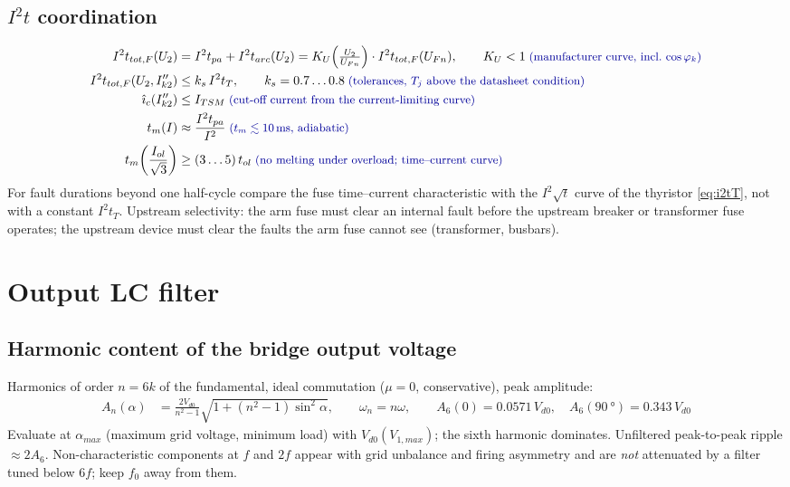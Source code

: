 \documentclass[10pt,a4paper]{scrartcl}
\newcommand{\Vdo}{V_{d0}}
\newcommand{\ITSM}{I_{TSM}}
\newcommand{\iit}{I^{2}t}
\newcommand{\Tj}{T_{j}}
\newcommand{\rt}[1]{\text{\small\color{blue!60!black} #1}}
\begin{document}
\subsection{\texorpdfstring{$\iit$ coordination}{I2t coordination}}
\begin{align}
\iit_{tot,F}(U_2) &= \iit_{pa} + \iit_{arc}(U_2) = K_U\!\left(\tfrac{U_2}{U_{Fn}}\right)\cdot \iit_{tot,F}(U_{Fn}), \qquad K_U < 1 \;\rt{(manufacturer curve, incl.\ $\cos\varphi_k$)} \label{eq:KU}\\
\iit_{tot,F}(U_2, I''_{k2}) &\le k_s\,\iit_T, \qquad k_s = 0.7\ldots0.8 \;\rt{(tolerances, $\Tj$ above the datasheet condition)} \label{eq:coord}\\
\hat\imath_{c}(I''_{k2}) &\le \ITSM \;\rt{(cut-off current from the current-limiting curve)} \label{eq:cutoff}\\
t_m(I) &\approx \frac{\iit_{pa}}{I^2} \;\rt{($t_m \lesssim \SI{10}{ms}$, adiabatic)} \\
t_m\!\left(\frac{I_{ol}}{\sqrt3}\right) &\ge (3\ldots5)\,t_{ol} \;\rt{(no melting under overload; time--current curve)} \label{eq:nomelt}
\end{align}
For fault durations beyond one half-cycle compare the fuse time--current characteristic with the $I^2\sqrt t$ curve of the thyristor \eqref{eq:i2tT}, not with a constant $\iit_T$. Upstream selectivity: the arm fuse must clear an internal fault before the upstream breaker or transformer fuse operates; the upstream device must clear the faults the arm fuse cannot see (transformer, busbars).

\section{Output LC filter}
\subsection{Harmonic content of the bridge output voltage}
Harmonics of order $n = 6k$ of the fundamental, ideal commutation ($\mu = 0$, conservative), peak amplitude:
\begin{align}
A_n(\alpha) &= \frac{2\Vdo}{n^2-1}\sqrt{1 + (n^2-1)\sin^2\alpha}, \qquad
\omega_n = n\omega, \qquad
A_6(0) = 0.0571\,\Vdo,\quad A_6(\SI{90}{\degree}) = 0.343\,\Vdo \label{eq:An}
\end{align}
Evaluate at $\alpha_{max}$ (maximum grid voltage, minimum load) with $\Vdo(V_{1,max})$; the sixth harmonic dominates. Unfiltered peak-to-peak ripple $\approx 2A_6$. Non-characteristic components at $f$ and $2f$ appear with grid unbalance and firing asymmetry and are \emph{not} attenuated by a filter tuned below $6f$; keep $f_0$ away from them.
\end{document}
